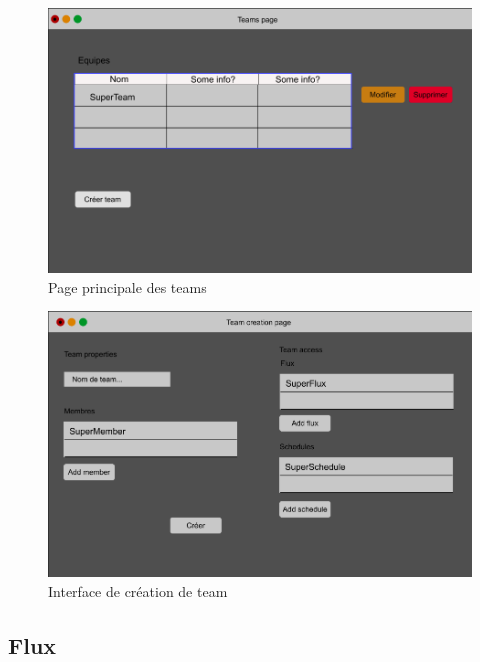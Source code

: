 \documentclass[french]{article}
\begin{document}
	\begin{figure}[ht!]
		\centering
		\includegraphics[scale=0.4]{mockup/m_teams_page}
		\caption{Page principale des teams}
		\label{fig:teamPage}
	\end{figure}
	
	\begin{figure}[h]
		\centering
		\includegraphics[scale=0.4]{mockup/m_team_creation}
		\caption{Interface de création de team}
		\label{fig:teamCreation}
	\end{figure}

\newpage	
\subsection{Flux}
\end{document}
